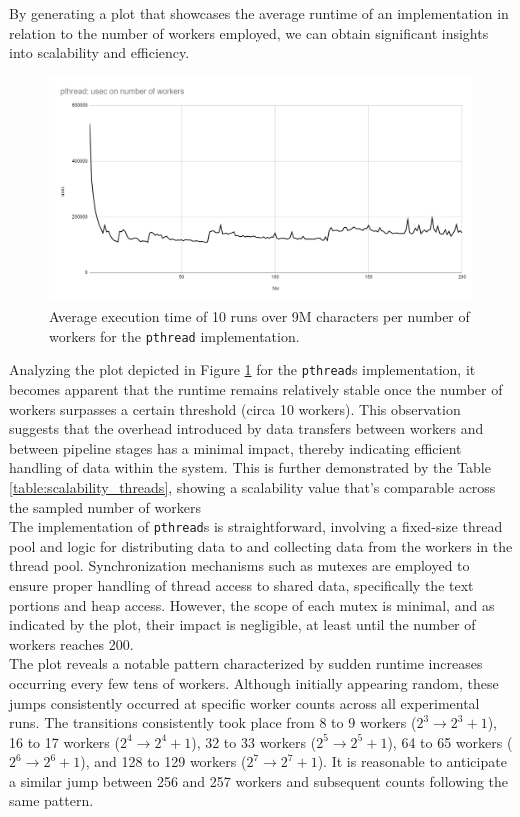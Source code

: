 \documentclass[10pt]{article}
\begin{document}
By generating a plot that showcases the average runtime of an implementation in relation to the number of workers employed, we can obtain significant insights into scalability and efficiency. 
\begin{figure}[H]
\begin{center}
	\includegraphics[scale=.6]{scalability_pthreads.png}
\end{center}
\caption{Average execution time of 10 runs over 9M characters per number of workers for the \texttt{pthread} implementation.}
\label{figure:scalability_threads}
\end{figure}
Analyzing the plot depicted in Figure \ref{figure:scalability_threads} for the \texttt{pthread}s implementation, it becomes apparent that the runtime remains relatively stable once the number of workers surpasses a certain threshold (circa 10 workers). This observation suggests that the overhead introduced by data transfers between workers and between pipeline stages has a minimal impact, thereby indicating efficient handling of data within the system. This is further demonstrated by the Table \ref{table:scalability_threads}, showing a scalability value that's comparable across the sampled number of workers\\
The implementation of \texttt{pthread}s is straightforward, involving a fixed-size thread pool and logic for distributing data to and collecting data from the workers in the thread pool. Synchronization mechanisms such as mutexes are employed to ensure proper handling of thread access to shared data, specifically the text portions and heap access. However, the scope of each mutex is minimal, and as indicated by the plot, their impact is negligible, at least until the number of workers reaches 200.\\
The plot reveals a notable pattern characterized by sudden runtime increases occurring every few tens of workers. Although initially appearing random, these jumps consistently occurred at specific worker counts across all experimental runs. The transitions consistently took place from 8 to 9 workers ($2^3 \rightarrow 2^3 + 1$), 16 to 17 workers ($2^4 \rightarrow 2^4 + 1$), 32 to 33 workers ($2^5 \rightarrow 2^5 + 1$), 64 to 65 workers ($2^6 \rightarrow 2^6 + 1$), and 128 to 129 workers ($2^7 \rightarrow 2^7 + 1$). It is reasonable to anticipate a similar jump between 256 and 257 workers and subsequent counts following the same pattern.\\
\end{document}
